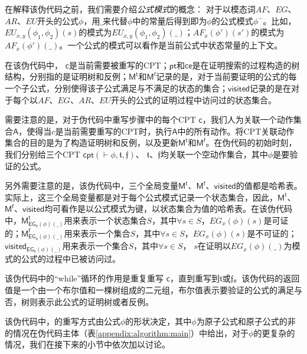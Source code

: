 在解释该伪代码之前，我们需要介绍\textit{公式模式}的概念：
对于以模态词$AF$、$EG$、$AR$、$EU$开头的公式$\phi$，用$\_$来代替$\phi$中的常量后得到即为$\phi$的公式模式$\phi^-$。比如，$EU_{x,y}(\phi_1,\phi_2)(s)$的模式为$EU_{x,y}(\phi_1,\phi_2)(\_)$；$AF_x(\phi')(s')$的模式为$AF_x(\phi')(\_)$。一个公式的模式可以看作是当前公式中状态常量的上下文。


在该伪代码中，
$\mathsf{c}$是当前需要被重写的\textsf{CPT}；$\mathsf{pt}$和$\mathsf{ce}$是在证明搜索的过程构造的树结构，分别指的是证明树和反例；$\mathsf{M^t}$和$\mathsf{M^f}$记录的是，对于当前要证明的公式的每一个子公式，分别使得该子公式满足与不满足的状态的集合；$\mathsf{visited}$记录的是在对于每个以$AF$、$EG$、$AR$、$EU$开头的公式的证明过程中访问过的状态集合。

需要注意的是，对于伪代码中重写步骤中的每个\textsf{CPT} $\mathsf{c}$，我们人为关联一个动作集合$\mathsf{A}$，使得当$c$是当前需要重写的\textsf{CPT}时，执行$\mathsf{A}$中的所有动作。将\textsf{CPT}关联动作集合的目的是为了构造证明树和反例，以及更新$\mathsf{M^t}$和$\mathsf{M^f}$。在伪代码的初始时刻，我们分别给三个\textsf{CPT} $\textsf{cpt}(\vdash\phi,\mathfrak{t},\mathfrak{f})$、 $\mathfrak{t}$、$\mathfrak{f}$均关联一个空动作集合，其中$\phi$是要验证的公式。


另外需要注意的是，该伪代码中，三个全局变量$\mathsf{M^t}$、$\mathsf{M^f}$、$\mathsf{visited}$的值都是哈希表。实际上，这三个全局变量都是对于每个公式模式记录一个状态集合，因此，$\mathsf{M^t}$、$\mathsf{M^f}$、$\mathsf{visited}$均可看作是以公式模式为键，以状态集合为值的哈希表。在该伪代码中，$\mathsf{M^t_{EG_{x}(\phi)(\_)}}$用来表示一个状态集合$S$，其中$\forall s\in S$，$EG_{x}(\phi)(s)$是可证的；$\mathsf{M^f_{EG_{x}(\phi)(\_)}}$用来表示一个集合$S$，其中$\forall s\in S$，$EG_{x}(\phi)(s)$是不可证的；$\mathsf{visited_{EG_x(\phi)(\_)}}$用来表示一个集合$S$，其中$\forall s\in S$， $s$在证明以$EG_x(\phi)(\_)$为模式的公式的过程中已被访问过。


该伪代码中的“while”循环的作用是重复重写\CPT{} $\mathsf{c}$，直到重写到$\mathfrak{t}$或$\mathfrak{f}$。该伪代码的返回值是一个由一个布尔值和一棵树组成的二元组，布尔值表示要验证的公式的满足与否，树则表示此公式的证明树或者反例。


该伪代码中，\CPT{}的重写方式由公式$\phi$的形状决定，其中$\phi$为原子公式和原子公式的非的情况在伪代码主体（表\ref{appendix:algorithm:main}）中给出，对于$\phi$的更复杂的情况，我们在接下来的小节中依次加以讨论。

